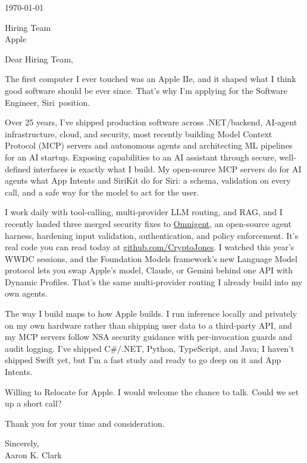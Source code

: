 \documentclass{resume}
\def\company{Apple}
\def\role{Software Engineer, Siri}
\def\manager{Hiring Team}          %
\begin{document}
\vspace{0.5em}
\today

\bigskip
\noindent \manager \\
\company

\bigskip
\noindent Dear \manager,

The first computer I ever touched was an Apple IIe, and it shaped what I think good software should be ever since. That's why I'm applying for the \role\ position.

Over 25 years, I've shipped production software across .NET/backend, AI-agent infrastructure, cloud, and security, most recently building Model Context Protocol (MCP) servers and autonomous agents and architecting ML pipelines for an AI startup. Exposing capabilities to an AI assistant through secure, well-defined interfaces is exactly what I build. My open-source MCP servers do for AI agents what App Intents and SiriKit do for Siri: a schema, validation on every call, and a safe way for the model to act for the user.

I work daily with tool-calling, multi-provider LLM routing, and RAG, and I recently landed three merged security fixes to \href{https://github.com/omnigent-ai/omnigent}{Omnigent}, an open-source agent harness, hardening input validation, authentication, and policy enforcement. It's real code you can read today at \href{https://github.com/CryptoJones}{github.com/CryptoJones}. I watched this year's WWDC sessions, and the Foundation Models framework's new Language Model protocol lets you swap Apple's model, Claude, or Gemini behind one API with Dynamic Profiles. That's the same multi-provider routing I already build into my own agents.

The way I build maps to how Apple builds. I run inference locally and privately on my own hardware rather than shipping user data to a third-party API, and my MCP servers follow NSA security guidance with per-invocation guards and audit logging. I've shipped C\#/.NET, Python, TypeScript, and Java; I haven't shipped Swift yet, but I'm a fast study and ready to go deep on it and App Intents.

Willing to Relocate for Apple. I would welcome the chance to talk. Could we set up a short call?

\bigskip
\noindent Thank you for your time and consideration.

\bigskip
\noindent Sincerely, \\[1em]
Aaron K. Clark
\end{document}
